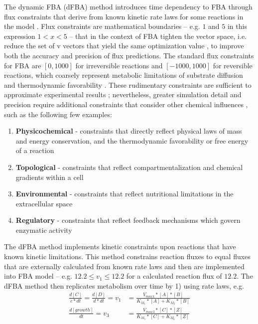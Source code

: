 The dynamic FBA (dFBA) method introduces time dependency to FBA through flux constraints that derive from known kinetic rate laws for some reactions in the model \cite{Machado2012ExploringMetabolism, Pernice2019IntegratingPractice, Mahadevan2002DynamicColi,Mahadevan2003TheModels}. Flux constraints are mathematical boundaries -- e.g. $1$ and $5$ in this expression $1<x<5$ -- that in the context of FBA tighten the vector space, i.e. reduce the set of v vectors that yield the same optimization value \cite{Covert2008IntegratingColi}, to improve both the accuracy and precision of flux predictions. The standard flux constraints for FBA are $[0,1000]$ for irreversible reactions and $[-1000,1000]$ for reversible reactions, which coarsely represent metabolic limitations of substrate diffusion and thermodynamic favorability \cite{Peres2017HowModes}. These rudimentary constraints are sufficient to approximate experimental results \cite{Edwards2001InData, Kauffman2003AdvancesAnalysis}; nevertheless, greater simulation detail and precision \cite{Magnusdottir2017GenerationMicrobiota} require additional constraints that consider other chemical influences \cite{Fleming2010IntegratedMetabolism}, such as the following few examples: 
\begin{enumerate}
    \item \textbf{Physicochemical} - constraints that directly reflect physical laws of mass and energy conservation, and the thermodynamic favorability or free energy of a reaction \cite{Henry2007}
    \item \textbf{Topological} - constraints that reflect compartmentalization and chemical gradients within a cell \cite{Price2004Genome-scaleConstraints}
    \item \textbf{Environmental} - constraints that reflect nutritional limitations in the extracellular space 
    \item \textbf{Regulatory} - constraints that reflect feedback mechanisms which govern enzymatic activity \cite{Covert2001RegulationMetabolism}
\end{enumerate}
The dFBA method implements kinetic constraints upon reactions that have known kinetic limitations. This method constrains reaction fluxes to equal fluxes that are externally calculated from known rate laws and then are implemented into FBA model -- e.g. $12.2\le v_1 \le 12.2$ for a calculated reaction flux of $12.2$. The dFBA method then replicates metabolism over time by 1) using rate laws, e.g. 
\begin{equation} \label{rate_laws}
    \begin{split}
        \frac{d[C]}{c*dt} = \frac{d[D]}{d*dt} = v_1 &= \frac{V_{max1}*[A]*[B]}{K_{M_1}*[A]+K_{M_2}*[B]} \\
        \frac{d[growth]}{dt} = v_3 &= \frac{V_{max3}*[C]*[Z]}{K_{M_5}*[C]+K_{M_6}*[Z]}
    \end{split}
\end{equation}
